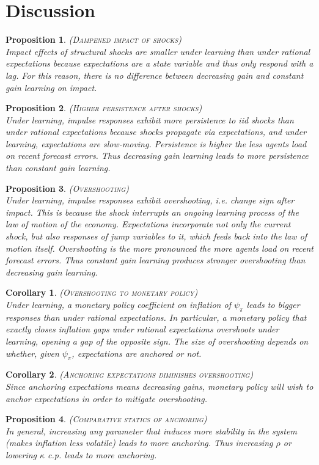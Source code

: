 \documentclass[11pt]{article}
\renewcommand{\[}{\begin{equation}}
\renewcommand{\]}{\end{equation}}
\newtheorem{prop}{Proposition}
\newtheorem{corollary}{Corollary}
\begin{document}
\section{Discussion}
	\begin{prop} \textsc{(Dampened impact of shocks)} \\
	Impact effects of structural shocks are smaller under learning than under rational expectations because expectations are a state variable and thus only respond with a lag. For this reason, there is no difference between decreasing gain and constant gain learning on impact.
	\end{prop}
	\begin{prop} \textsc{(Higher persistence after shocks)} \\
	Under learning, impulse responses exhibit more persistence to iid shocks than under rational expectations because shocks propagate via expectations, and under learning, expectations are slow-moving. Persistence is higher the less agents load on recent forecast errors. Thus decreasing gain learning leads to more persistence than constant gain learning. 
	\end{prop}
	\begin{prop} \textsc{(Overshooting)} \\
	Under learning, impulse responses exhibit overshooting, i.e. change sign after impact. This is because the shock interrupts an ongoing learning process of the law of motion of the economy. Expectations incorporate not only the current shock, but also responses of jump variables to it, which feeds back into the law of motion itself. Overshooting is the more pronounced the more agents load on recent forecast errors. Thus constant gain learning produces stronger overshooting than decreasing gain learning. 
	\end{prop}
	\begin{corollary} \textsc{(Overshooting to monetary policy)} \\
	Under learning, a monetary policy coefficient on inflation of $\psi_{\pi}$ leads to bigger responses than under rational expectations. In particular, a monetary policy that exactly closes inflation gaps under rational expectations overshoots under learning, opening a gap of the opposite sign. The size of overshooting depends on whether, given $\psi_{\pi}$, expectations are anchored or not. 
	\end{corollary}
	\begin{corollary} \textsc{(Anchoring expectations diminishes overshooting)} \\
	Since anchoring expectations means decreasing gains, monetary policy will wish to anchor expectations in order to mitigate overshooting. 
	\end{corollary}
	\begin{prop}\textsc{(Comparative statics of anchoring)} \\
	In general, increasing any parameter that induces more stability in the system (makes inflation less volatile) leads to more anchoring. Thus increasing $\rho$ or lowering $\kappa$ c.p. leads to more anchoring.
	\end{prop}
	
\end{document}
